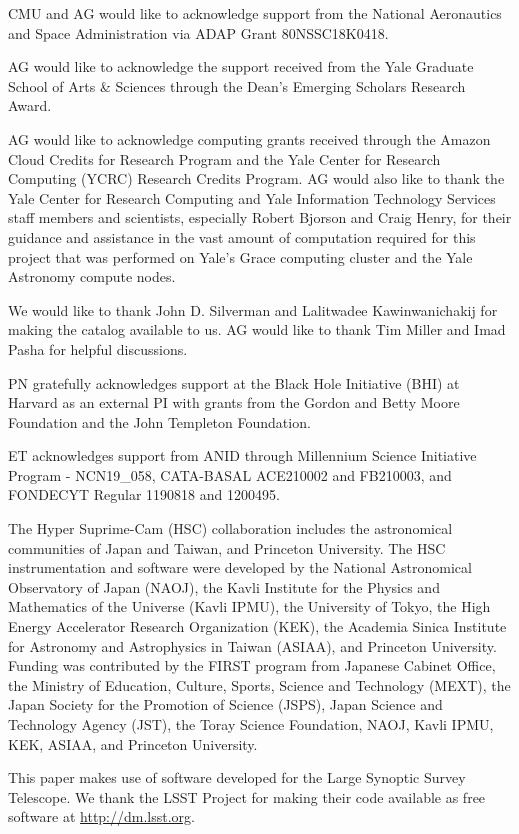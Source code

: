 CMU and AG would like to acknowledge support from the National Aeronautics and Space Administration via ADAP Grant 80NSSC18K0418. 

AG would like to acknowledge the support received from the Yale Graduate School of Arts \& Sciences through the Dean's Emerging Scholars Research Award.

AG would like to acknowledge computing grants received through the Amazon Cloud Credits for Research Program and the Yale Center for Research Computing (YCRC) Research Credits Program. AG would also like to thank the Yale Center for Research Computing and Yale Information Technology Services staff members and scientists, especially Robert Bjorson and Craig Henry, for their guidance and assistance in the vast amount of computation required for this project that was performed on Yale's Grace computing cluster and the Yale Astronomy compute nodes. 

We would like to thank John D. Silverman and Lalitwadee Kawinwanichakij for making the \citet{hsc_sersic} catalog available to us. AG would like to thank Tim Miller and Imad Pasha for helpful discussions.

PN gratefully acknowledges support at the Black Hole Initiative (BHI) at Harvard as an external PI with grants from the Gordon and Betty Moore Foundation and the John Templeton Foundation.

ET acknowledges support from ANID through Millennium Science Initiative Program - NCN19\_058, CATA-BASAL ACE210002 and FB210003, and FONDECYT Regular 1190818 and 1200495.

The Hyper Suprime-Cam (HSC) collaboration includes the astronomical communities of Japan and Taiwan, and Princeton University. The HSC instrumentation and software were developed by the National Astronomical Observatory of Japan (NAOJ), the Kavli Institute for the Physics and Mathematics of the Universe (Kavli IPMU), the University of Tokyo, the High Energy Accelerator Research Organization (KEK), the Academia Sinica Institute for Astronomy and Astrophysics in Taiwan (ASIAA), and Princeton University. Funding was contributed by the FIRST program from Japanese Cabinet Office, the Ministry of Education, Culture, Sports, Science and Technology (MEXT), the Japan Society for the Promotion of Science (JSPS), Japan Science and Technology Agency (JST), the Toray Science Foundation, NAOJ, Kavli IPMU, KEK, ASIAA, and Princeton University. 

This paper makes use of software developed for the Large Synoptic Survey Telescope. We thank the LSST Project for making their code available as free software at  \href{http://dm.lsst.org}{http://dm.lsst.org}.

